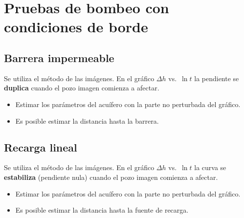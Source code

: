 \section{Pruebas de bombeo con condiciones de borde}

\subsection{Barrera impermeable}
Se utiliza el método de las imágenes. En el gráfico $\Delta h$ vs.\ $\ln t$
la pendiente se \textbf{duplica} cuando el pozo imagen comienza a afectar.
\begin{itemize}
  \item Estimar los parámetros del acuífero con la parte no perturbada del gráfico.
  \item Es posible estimar la distancia hasta la barrera.
\end{itemize}

\subsection{Recarga lineal}
Se utiliza el método de las imágenes. En el gráfico $\Delta h$ vs.\ $\ln t$
la curva se \textbf{estabiliza} (pendiente nula) cuando el pozo imagen
comienza a afectar.
\begin{itemize}
  \item Estimar los parámetros del acuífero con la parte no perturbada del gráfico.
  \item Es posible estimar la distancia hasta la fuente de recarga.
\end{itemize}

